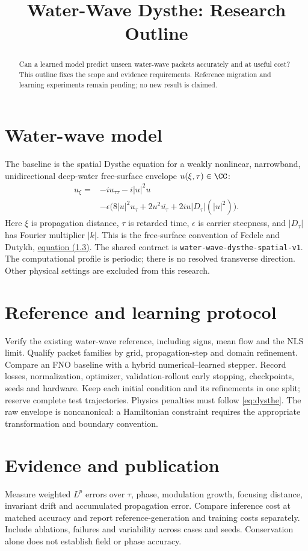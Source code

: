 \documentclass[11pt]{article}
\title{Water-Wave Dysthe: Research Outline}
\author{}
\date{}
\begin{document}
\maketitle
\begin{abstract}
Can a learned model predict unseen water-wave packets accurately and at useful
cost? This outline fixes the scope and evidence requirements. Reference migration
and learning experiments remain pending; no new result is claimed.
\end{abstract}
\section{Water-wave model}
The baseline is the spatial Dysthe equation for a weakly nonlinear, narrowband,
unidirectional deep-water free-surface envelope $u(\xi,\tau)\in\CC$:
\begin{equation}\label{eq:dysthe}
\begin{aligned}
u_\xi={}&-i u_{\tau\tau}-i|u|^2u\\
&-\epsilon\bigl(8|u|^2u_\tau+2u^2\overline{u_\tau}
                 +2iu|D_\tau|(|u|^2)\bigr).
\end{aligned}
\end{equation}
Here $\xi$ is propagation distance, $\tau$ is retarded time, $\epsilon$ is
carrier steepness, and $|D_\tau|$ has Fourier multiplier $|k|$.
This is the free-surface convention of Fedele and Dutykh,
\href{https://arxiv.org/abs/1110.3605}{equation (1.3)}.
The shared contract is \texttt{water-wave-dysthe-spatial-v1}.
The computational profile is periodic; there is no resolved transverse
direction. Other physical settings are excluded from this research.
\section{Reference and learning protocol}
Verify the existing water-wave reference, including signs, mean flow and the NLS
limit. Qualify packet families by grid, propagation-step and domain refinement.
Compare an FNO baseline with a hybrid numerical--learned stepper. Record losses,
normalization, optimizer, validation-rollout early stopping, checkpoints, seeds
and hardware. Keep each initial condition and its refinements in one split;
reserve complete test trajectories. Physics penalties must follow
\eqref{eq:dysthe}. The raw envelope is noncanonical: a Hamiltonian constraint
requires the appropriate transformation and boundary convention.
\section{Evidence and publication}
Measure weighted $L^p$ errors over $\tau$, phase, modulation growth, focusing
distance, invariant drift and accumulated propagation error. Compare inference
cost at matched accuracy and report reference-generation and training costs
separately. Include ablations, failures and variability across cases and seeds.
Conservation alone does not establish field or phase accuracy.
\end{document}
